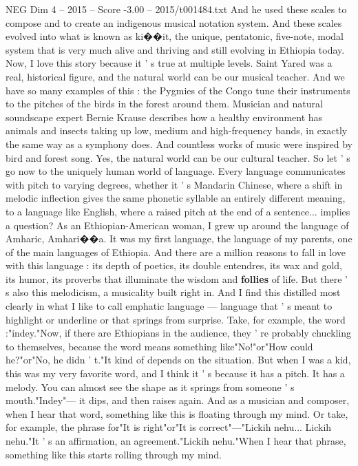 \begin{textsample}{NEG Dim 4 – 2015 – Score -3.00 – 2015/t001484.txt}
And he used these scales to compose and to create an indigenous musical notation system.
And these scales evolved into what is known as ki{\EmojiFont �}{\EmojiFont �}it, the unique, pentatonic, five-note, modal system that is very much alive and thriving and still evolving in Ethiopia today.
Now, I love this story because it ' s true at multiple levels.
Saint Yared was a real, historical figure, and the natural world can be our musical teacher.
And we have so many examples of this : the Pygmies of the Congo tune their instruments to the pitches of the birds in the forest around them.
Musician and natural soundscape expert Bernie Krause describes how a healthy environment has animals and insects taking up low, medium and high-frequency bands, in exactly the same way as a symphony does.
And countless works of music were inspired by bird and forest song.
Yes, the natural world can be our cultural teacher.
So let ' s go now to the uniquely human world of language.
Every language communicates with pitch to varying degrees, whether it ' s Mandarin Chinese, where a shift in melodic inflection gives the same phonetic syllable an entirely different meaning, to a language like English, where a raised pitch at the end of a sentence... implies a question?
As an Ethiopian-American woman, I grew up around the language of Amharic, Amhari{\EmojiFont �}{\EmojiFont �}a.
It was my first language, the language of my parents, one of the main languages of Ethiopia.
And there are a million reasons to fall in love with this language : its depth of poetics, its double entendres, its wax and gold, its humor, its proverbs that illuminate the wisdom and \textbf{follies} of life.
But there ' s also this melodicism, a musicality built right in.
And I find this distilled most clearly in what I like to call emphatic language — language that ' s meant to highlight or underline or that springs from surprise.
Take, for example, the word :"indey."Now, if there are Ethiopians in the audience, they ' re probably chuckling to themselves, because the word means something like"No!"or"How could he?"or"No, he didn ' t."It kind of depends on the situation.
But when I was a kid, this was my very favorite word, and I think it ' s because it has a pitch.
It has a melody.
You can almost see the shape as it springs from someone ' s mouth."Indey"— it dips, and then raises again.
And as a musician and composer, when I hear that word, something like this is floating through my mind.
Or take, for example, the phrase for"It is right"or"It is correct"—"Lickih nehu...
Lickih nehu."It ' s an affirmation, an agreement."Lickih nehu."When I hear that phrase, something like this starts rolling through my mind.

\end{textsample}
